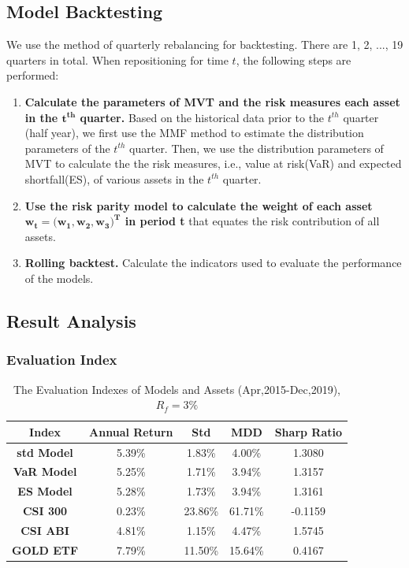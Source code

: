 \subsection{Model Backtesting}
We use the method of quarterly rebalancing for backtesting. There are 1, 2, ..., 19 quarters in total. When repositioning for time $t$, the following steps are performed:
\begin{enumerate}
    \item \textbf{Calculate the parameters of MVT and the risk measures each asset in the $\boldsymbol t^{\boldsymbol t\boldsymbol h}$ quarter.} Based on the historical data prior to the $t^{th}$ quarter (half year), we first use the MMF method to estimate the distribution parameters of the $t^{th}$ quarter. Then, we use the distribution parameters of MVT to calculate the the risk measures, i.e., value at risk(VaR) and expected shortfall(ES), of various assets in the $t^{th}$ quarter.
    \item \textbf{Use the risk parity model to calculate the weight of each asset $\boldsymbol w_{\boldsymbol t} \boldsymbol = \boldsymbol (\boldsymbol w_{\boldsymbol 1}, \boldsymbol w_{\boldsymbol 2}, \boldsymbol w_{\boldsymbol 3}\boldsymbol )^{\boldsymbol T}$ in period t} that equates the risk contribution of all assets.
    \item \textbf{Rolling backtest.} Calculate the indicators used to evaluate the performance of the models.
\end{enumerate}

\subsection{Result Analysis}
\subsubsection{Evaluation Index}
\begin{table}[H]
    \centering
   \begin{tabular}{|c|c|c|c|c|}
    \hline
    {\bf Index} & {\bf Annual Return} &  {\bf Std} &  {\bf MDD} & {\bf Sharp Ratio}  \\
    \hline
    {\bf std Model} &     5.39\% &     1.83\% &     4.00\% &    1.3080    \\
    \hline
    {\bf VaR Model} &     5.25\% &     1.71\% &     3.94\% &    1.3157   \\
    \hline
    {\bf ES Model} &     5.28\% &     1.73\% &     3.94\% &    1.3161   \\
    \hline
    {\bf CSI 300} &     0.23\% &    23.86\% &    61.71\% &   -0.1159    \\
    \hline
    {\bf CSI ABI} &     4.81\% &     1.15\% &     4.47\% &    1.5745   \\
    \hline
    {\bf GOLD ETF} &     7.79\% &    11.50\% &    15.64\% &    0.4167  \\
    \hline
    \end{tabular}  
    \caption{The Evaluation Indexes of Models and Assets (Apr,2015-Dec,2019),$R_f=3\%$}
    \label{Tab3}
\end{table}

